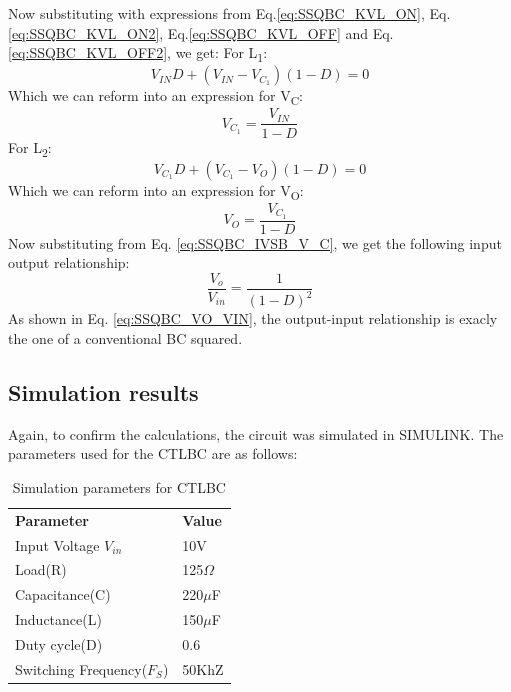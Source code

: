 Now substituting with expressions from Eq.\ref{eq:SSQBC_KVL_ON}, Eq.\ref{eq:SSQBC_KVL_ON2}, Eq.\ref{eq:SSQBC_KVL_OFF} and  Eq.\ref{eq:SSQBC_KVL_OFF2}, we get:
For L\textsubscript{1}:
\begin{equation}
	V_{IN}D+(V_{IN}-V_{C_1})(1-D)=0
	\label{eq:SSQBC_IVSB_L1}
\end{equation}
Which we can reform into an expression for V\textsubscript{C}:
\begin{equation}
	V_{C_1}=\frac{V_{IN}}{1-D}
	\label{eq:SSQBC_IVSB_V_C}
\end{equation}
For L\textsubscript{2}:
\begin{equation}
	V_{C_1}D+(V_{C_1}-V_{O})(1-D)=0
	\label{eq:SSQBC_IVSB_L2}
\end{equation}
Which we can reform into an expression for V\textsubscript{O}:
\begin{equation}
	V_{O}=\frac{V_{C_1}}{1-D}
	\label{eq:SSQBC_IVSB_V_O}
\end{equation}
Now substituting from Eq. \ref{eq:SSQBC_IVSB_V_C}, we get the following input output relationship:
\begin{equation}
	\frac{V_o}{V_{in}} = \frac{1}{(1-D)^2}
	\label{eq:SSQBC_VO_VIN}
\end{equation}
As shown in Eq. \ref{eq:SSQBC_VO_VIN}, the output-input relationship is exacly the one of a conventional BC squared. 

\subsection{Simulation results}

Again, to confirm the calculations, the circuit was simulated in SIMULINK. The parameters used for the CTLBC are as follows:

\begin{table}[H]
\begin{center}
\caption {Simulation parameters for CTLBC} \label{tab:CTLBC} 
\begin{tabular}{|l|l|}
\cline{1-2}
\textbf{Parameter} & \textbf{Value}  \\ \cline{1-2}
Input Voltage $V_{in}$          &      10V   \\ \cline{1-2}
Load(R)   & 125$\Omega$           \\ \cline{1-2}
Capacitance(C)          &       220$\mu$F     \\ \cline{1-2}
Inductance(L)          &      150$\mu$F      \\ \cline{1-2}
Duty cycle(D)          &     0.6       \\ \cline{1-2}
Switching Frequency($F_S$)          &      50KhZ      \\ \cline{1-2}
\end{tabular}
\end{center}
\end{table}

